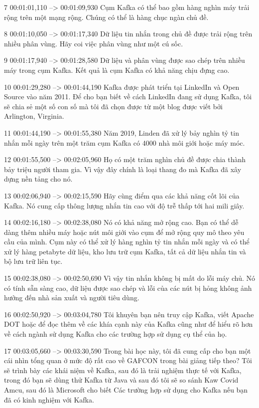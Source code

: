 7
00:01:01,110 --> 00:01:09,930
Cụm Kafka có thể bao gồm hàng nghìn máy trải rộng trên một mạng rộng.  Chúng có thể là hàng chục ngàn chủ đề.

8
00:01:10,050 --> 00:01:17,340
Dữ liệu tin nhắn trong chủ đề được trải rộng trên nhiều phân vùng.  Hãy coi việc phân vùng như một cú sốc.

9
00:01:17,940 --> 00:01:28,580
Dữ liệu và phân vùng được sao chép trên nhiều máy trong cụm Kafka.  Kết quả là cụm Kafka có khả năng chịu đựng cao.

10
00:01:29,280 --> 00:01:44,190
Kafka được phát triển tại LinkedIn và Open Source vào năm 2011. Để cho bạn biết về cách LinkedIn đang sử dụng Kafka, tôi sẽ chia sẻ một số con số mà tôi đã chọn được từ một blog được viết bởi Arlington, Virginia.

11
00:01:44,190 --> 00:01:55,380
Năm 2019, Linden đã xử lý bảy nghìn tỷ tin nhắn mỗi ngày trên một trăm cụm Kafka có 4000 nhà môi giới hoặc máy móc.

12
00:01:55,500 --> 00:02:05,960
Họ có một trăm nghìn chủ đề được chia thành bảy triệu người tham gia.  Vì vậy đây chính là loại thang đo mà Kafka đã xây dựng nền tảng cho nó.

13
00:02:06,940 --> 00:02:15,590
Hãy cùng điểm qua các khả năng cốt lõi của Kafka.  Nó cung cấp thông lượng nhắn tin cao với độ trễ thấp tới hai mili giây.

14
00:02:16,180 --> 00:02:38,080
Nó có khả năng mở rộng cao.  Bạn có thể dễ dàng thêm nhiều máy hoặc nút môi giới vào cụm để mở rộng quy mô theo yêu cầu của mình. Cụm này có thể xử lý hàng nghìn tỷ tin nhắn mỗi ngày và có thể xử lý hàng petabyte dữ liệu, kho lưu trữ cụm Kafka, tất cả dữ liệu nhắn tin và bộ lưu trữ liên tục.

15
00:02:38,080 --> 00:02:50,690
Vì vậy tin nhắn không bị mất do lỗi máy chủ.  Nó có tính sẵn sàng cao, dữ liệu được sao chép và lỗi của các nút bị hỏng không ảnh hưởng đến nhà sản xuất và người tiêu dùng.

16
00:02:50,920 --> 00:03:04,780
Tôi khuyên bạn nên truy cập Kafka, viết Apache DOT hoặc để đọc thêm về các khía cạnh này của Kafka cũng như để hiểu rõ hơn về cách ngành sử dụng Kafka cho các trường hợp sử dụng cụ thể của họ.

17
00:03:05,660 --> 00:03:30,590
Trong bài học này, tôi đã cung cấp cho bạn một cái nhìn tổng quan ở mức độ rất cao về GAFCON trong bài giảng tiếp theo?  Tôi sẽ trình bày các khái niệm về Kafka, sau đó là trải nghiệm thực tế với Kafka, trong đó bạn sẽ dùng thử Kafka từ Java và sau đó tôi sẽ so sánh Kaw Covid Amcu, sau đó là Microsoft cho biết Các trường hợp sử dụng cho Kafka nếu bạn đã có kinh nghiệm với Kafka.

